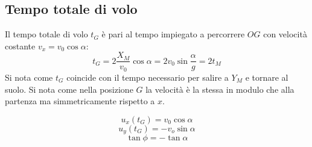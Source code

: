 \documentclass[class=book, crop=false, oneside, 12pt]{standalone}
\begin{document}
	\subsection{Tempo totale di volo}
	Il tempo totale di volo $t_G$ \`e pari al tempo impiegato a percorrere $OG$ con velocit\`a costante $v_x=v_0\cos\alpha$:
	$$t_G=2\dfrac{X_M}{v_0}\cos\alpha=2v_0\sin\dfrac{\alpha}{g}=2t_M$$
	Si nota come $t_G$ coincide con il tempo necessario per salire a $Y_M$ e tornare al suolo.
	Si nota come nella posizione $G$ la velocit\`a \`e la stessa in modulo che alla partenza ma simmetricamente rispetto a $x$.
  \begin{multicols}{3}
    \noindent
    $$u_x(t_G)=v_0\cos\alpha$$
    $$u_y(t_G)=-v_o\sin\alpha$$
    $$\tan\phi=-\tan\alpha$$
  \end{multicols}
\end{document}
